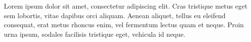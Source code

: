 \documentclass[conference,compsoc]{IEEEtran}
\begin{document}
Lorem ipsum dolor sit amet, consectetur adipiscing elit. Cras tristique metus eget sem lobortis, vitae dapibus orci aliquam. Aenean aliquet, tellus eu eleifend consequat, erat metus rhoncus enim, vel fermentum lectus quam et neque. Proin urna ipsum, sodales facilisis tristique eget, vehicula id neque.










\end{document}

